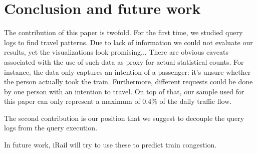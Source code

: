 \documentclass{sig-alternate}
\begin{document}
\section{Conclusion and future work}
\label{sec:conclusion}

The contribution of this paper is twofold.
For the first time, we studied query logs to find travel patterns.
Due to lack of information we could not evaluate our results, yet the visualizations look promising...
There are obvious caveats associated with the use of such data as proxy for actual statistical counts. 
For instance, the data only captures an intention of a passenger: it's unsure whether the person actually took the train.
Furthermore, different requests could be done by one person with an intention to travel.
On top of that, our sample used for this paper can only represent a maximum of 0.4\% of the daily traffic flow.

The second contribution is our position that we suggest to decouple the query logs from the query execution.

In future work, iRail will try to use these to predict train congestion.
\let\oldsection\section
\renewcommand{\section}[2][1]{\oldsection{#1}\vspace{-3pt}}



\end{document}
